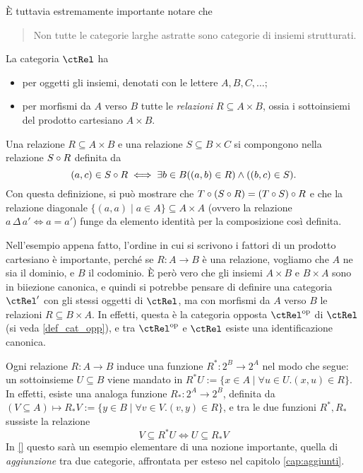 \`E tuttavia estremamente importante notare che 
\begin{quote}
Non tutte le categorie larghe astratte sono categorie di insiemi strutturati.
\end{quote}
\begin{example}\label{ex_cat_rels}
	La categoria \(\ctRel\) ha
	\begin{itemize}
		\item per oggetti gli insiemi, denotati con le lettere \(A,B,C,\dots\);
		\item per morfismi da \(A\) verso \(B\) tutte le \emph{relazioni} \(R\subseteq A\times B\), ossia i sottoinsiemi del prodotto cartesiano \(A\times B\).
	\end{itemize}
	Una relazione \(R\subseteq A\times B\) e una relazione \(S\subseteq B\times C\) si compongono nella relazione \(S\circ R\) definita da
	\[(a,c)\in S\circ R\iff \exists b\in B ((a,b)\in R)\land ((b,c)\in S).\]
	Con questa definizione, si può mostrare che \(T\circ(S\circ R)=(T\circ S)\circ R\) e che la relazione diagonale \(\{(a,a)\mid a\in A\}\subseteq A\times A\) (ovvero la relazione \(a\,\Delta\,a'\iff a=a'\)) funge da elemento identità per la composizione così definita.
\end{example}
Nell'esempio appena fatto, l'ordine in cui si scrivono i fattori di un prodotto cartesiano è importante, perché se \(R : A\to B\) è una relazione, vogliamo che \(A\) ne sia il dominio, e \(B\) il codominio. \`E però vero che gli insiemi \(A\times B\) e \(B\times A\) sono in biiezione canonica, e quindi si potrebbe pensare di definire una categoria \(\ctRel'\) con gli stessi oggetti di \(\ctRel\), ma con morfismi da \(A\) verso \(B\) le relazioni \(R\subseteq B\times A\). In effetti, questa è la categoria opposta \(\ctRel^\op\) di \(\ctRel\) (si veda \ref{def_cat_opp}), e tra \(\ctRel^\op\) e \(\ctRel\) esiste una identificazione canonica.
\begin{remark}\label{klext_delle_relazioni}
	Ogni relazione \(R : A\to B\) induce una funzione \(R^* : 2^B\to 2^A\) nel modo che segue: un sottoinsieme \(U\subseteq B\) viene mandato in \(R^*U:=\{x\in A\mid \forall u\in U.(x,u)\in R\}\). In effetti, esiste una analoga funzione \(R_* : 2^A\to 2^B\), definita da \((V\subseteq A) \mapsto R_*V:= \{y\in B\mid \forall v\in V.(v,y)\in R\}\), e tra le due funzioni \(R^*, R_*\) sussiste la relazione
	\[V\subseteq R^*U \iff U\subseteq R_*V\label{aggiunti_in_disguise}\]
	In \ref{} questo sarà un esempio elementare di una nozione importante, quella di \emph{aggiunzione} tra due categorie, affrontata per esteso nel capitolo \ref{cap:aggiunti}.
\end{remark}
